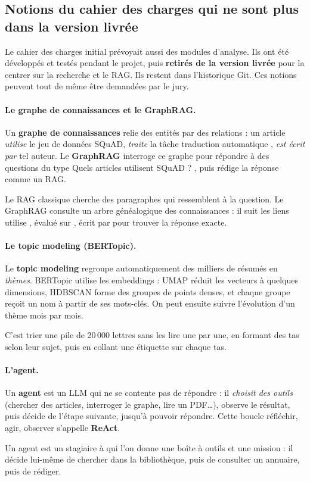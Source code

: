 \documentclass[11pt,a4paper]{article}
\begin{document}
\subsection{Notions du cahier des charges qui ne sont plus dans la version livrée}

Le cahier des charges initial prévoyait aussi des modules d'analyse. Ils ont été développés
et testés pendant le projet, puis \textbf{retirés de la version livrée} pour la centrer sur
la recherche et le RAG. Ils restent dans l'historique Git. Ces notions peuvent tout de même
être demandées par le jury.

\paragraph{Le graphe de connaissances et le GraphRAG.}
Un \textbf{graphe de connaissances} relie des entités par des relations : un article
\emph{utilise} le jeu de données SQuAD, \emph{traite} la tâche \og traduction
automatique \fg{}, \emph{est écrit par} tel auteur. Le \textbf{GraphRAG} interroge ce graphe
pour répondre à des questions du type \og Quels articles utilisent SQuAD ? \fg{}, puis
rédige la réponse comme un RAG.
\begin{analogie}
Le RAG classique cherche des paragraphes qui ressemblent à la question. Le GraphRAG consulte
un arbre généalogique des connaissances : il suit les liens \og utilise \fg{},
\og évalué sur \fg{}, \og écrit par \fg{} pour trouver la réponse exacte.
\end{analogie}

\paragraph{Le topic modeling (BERTopic).}
Le \textbf{topic modeling} regroupe automatiquement des milliers de résumés en
\emph{thèmes}. BERTopic utilise les embeddings : UMAP réduit les vecteurs à quelques
dimensions, HDBSCAN forme des groupes de points denses, et chaque groupe reçoit un nom à
partir de ses mots-clés. On peut ensuite suivre l'évolution d'un thème mois par mois.
\begin{analogie}
C'est trier une pile de 20\,000 lettres sans les lire une par une, en formant des tas selon
leur sujet, puis en collant une étiquette sur chaque tas.
\end{analogie}

\paragraph{L'agent.}
Un \textbf{agent} est un LLM qui ne se contente pas de répondre : il \emph{choisit des
outils} (chercher des articles, interroger le graphe, lire un PDF\ldots), observe le
résultat, puis décide de l'étape suivante, jusqu'à pouvoir répondre. Cette boucle
\og réfléchir, agir, observer \fg{} s'appelle \textbf{ReAct}.
\begin{analogie}
Un agent est un stagiaire à qui l'on donne une boîte à outils et une mission : il décide
lui-même de chercher dans la bibliothèque, puis de consulter un annuaire, puis de rédiger.
\end{analogie}
\end{document}
